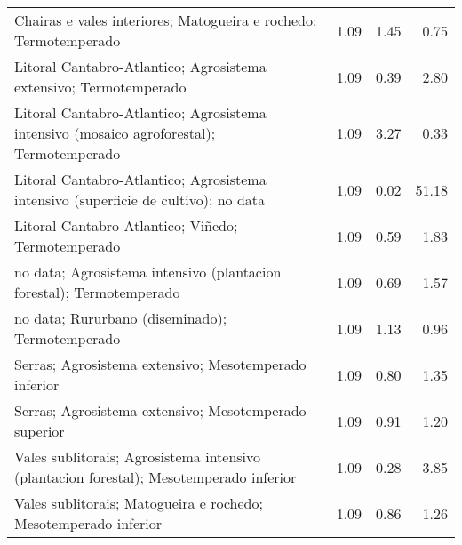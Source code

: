 \begin{table}[p]
\begin{tabular}{lrrr}
  Chairas e vales interiores; Matogueira e rochedo; Termotemperado & 1.09 & 1.45 & 0.75 \\ 
  Litoral Cantabro-Atlantico; Agrosistema extensivo; Termotemperado & 1.09 & 0.39 & 2.80 \\ 
  Litoral Cantabro-Atlantico; Agrosistema intensivo (mosaico agroforestal); Termotemperado & 1.09 & 3.27 & 0.33 \\ 
  Litoral Cantabro-Atlantico; Agrosistema intensivo (superficie de cultivo); no data & 1.09 & 0.02 & 51.18 \\ 
  Litoral Cantabro-Atlantico; Viñedo; Termotemperado & 1.09 & 0.59 & 1.83 \\ 
  no data; Agrosistema intensivo (plantacion forestal); Termotemperado & 1.09 & 0.69 & 1.57 \\ 
  no data; Rururbano (diseminado); Termotemperado & 1.09 & 1.13 & 0.96 \\ 
  Serras; Agrosistema extensivo; Mesotemperado inferior & 1.09 & 0.80 & 1.35 \\ 
  Serras; Agrosistema extensivo; Mesotemperado superior & 1.09 & 0.91 & 1.20 \\ 
  Vales sublitorais; Agrosistema intensivo (plantacion forestal); Mesotemperado inferior & 1.09 & 0.28 & 3.85 \\ 
  Vales sublitorais; Matogueira e rochedo; Mesotemperado inferior & 1.09 & 0.86 & 1.26 \\ 
   \hline
\end{tabular}
\end{table}
